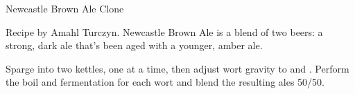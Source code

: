 \begin{recipe}{Newcastle Brown Ale Clone}

\begin{aboutblock}
Recipe by Amahl Turczyn. Newcastle Brown Ale is a blend of two beers: a strong,
dark ale that's been aged with a younger, amber ale.
\end{aboutblock}


\begin{methodandtiming}

\begin{mashsteps}
\end{mashsteps}

\begin{fermentationsteps}
\end{fermentationsteps}

\begin{directions}
Sparge into two kettles, one at a time, then adjust wort gravity to 
and . Perform the boil and fermentation for each wort and blend the
resulting ales 50/50.
\end{directions}

\end{methodandtiming}

\recipebreak

\begin{ingredientsblock}

\begin{malts}
\end{malts}

\begin{hops}
\end{hops}


\end{ingredientsblock}

\end{recipe}


